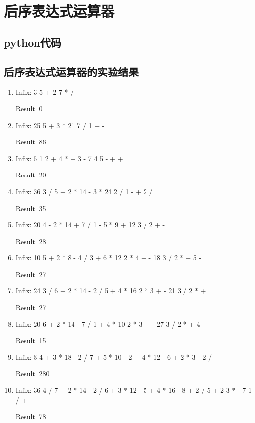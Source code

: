 \documentclass{article}
\begin{document}
\section{后序表达式运算器}
\subsection{python代码}


\subsection{后序表达式运算器的实验结果}
\begin{enumerate}
	\item
Infix: 3 5 + 2 7 * /

Result: 0
\item
Infix: 25 5 + 3 * 21 7 / 1 + -

Result: 86
\item
Infix:  5 1 2 + 4 * + 3 - 7 4 5 - + +

Result: 20
\item
Infix:  36 3 / 5 + 2 * 14 - 3 * 24 2 / 1 - + 2 /

Result: 35
\item
Infix:  20 4 - 2 * 14 + 7 / 1 - 5 * 9 + 12 3 / 2 + -

Result: 28
\item
Infix:  10 5 + 2 * 8 - 4 / 3 + 6 * 12 2 * 4 + - 18 3 / 2 * + 5 -

Result: 27
\item
Infix: 24 3 / 6 + 2 * 14 - 2 / 5 + 4 * 16 2 * 3 + - 21 3 / 2 * +

Result: 27
\item
Infix:  20 6 + 2 * 14 - 7 / 1 + 4 * 10 2 * 3 + - 27 3 / 2 * + 4 -

Result: 15
\item
Infix:  8 4 + 3 * 18 - 2 / 7 + 5 * 10 - 2 + 4 * 12 - 6 + 2 * 3 - 2 /

Result: 280
\item
Infix:  36 4 / 7 + 2 * 14 - 2 / 6 + 3 * 12 - 5 + 4 * 16 - 8 + 2 / 5 + 2 3 * - 7 1 / +

Result: 78

\end{enumerate}
\end{document}
